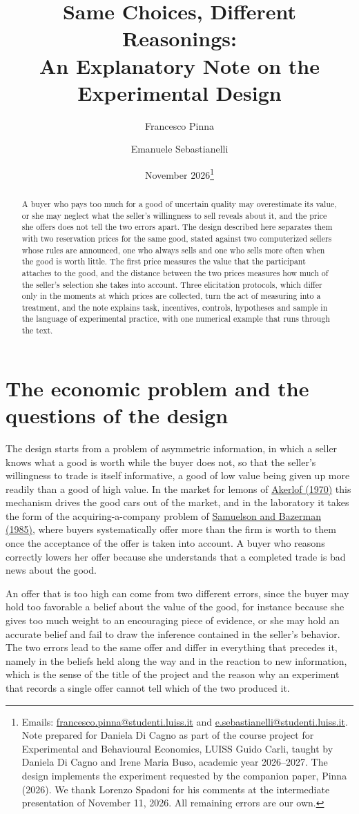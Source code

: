 \documentclass[11pt,a4paper]{article}
\title{Same Choices, Different Reasonings:\\ An Explanatory Note on the Experimental Design}
\author{Francesco Pinna \and Emanuele Sebastianelli}
\date{November 2026\thanks{Emails: \href{mailto:francesco.pinna@studenti.luiss.it}{francesco.pinna@studenti.luiss.it} and \href{mailto:e.sebastianelli@studenti.luiss.it}{e.sebastianelli@studenti.luiss.it}. Note prepared for Daniela Di Cagno as part of the course project for Experimental and Behavioural Economics, LUISS Guido Carli, taught by Daniela Di Cagno and Irene Maria Buso, academic year 2026--2027. The design implements the experiment requested by the companion paper, Pinna (2026). We thank Lorenzo Spadoni for his comments at the intermediate presentation of November 11, 2026. All remaining errors are our own.}}
\newcommand{\cy}[2]{\hyperlink{cite.#1}{\textcolor{citecolor}{#2}}}
\begin{document}
\maketitle

\begin{abstract}
\noindent A buyer who pays too much for a good of uncertain quality may overestimate its value, or she may neglect what the seller's willingness to sell reveals about it, and the price she offers does not tell the two errors apart. The design described here separates them with two reservation prices for the same good, stated against two computerized sellers whose rules are announced, one who always sells and one who sells more often when the good is worth little. The first price measures the value that the participant attaches to the good, and the distance between the two prices measures how much of the seller's selection she takes into account. Three elicitation protocols, which differ only in the moments at which prices are collected, turn the act of measuring into a treatment, and the note explains task, incentives, controls, hypotheses and sample in the language of experimental practice, with one numerical example that runs through the text.
\end{abstract}

\section{The economic problem and the questions of the design}\label{sec:problem}

The design starts from a problem of asymmetric information, in which a seller knows what a good is worth while the buyer does not, so that the seller's willingness to trade is itself informative, a good of low value being given up more readily than a good of high value. In the market for lemons of \cy{akerlof}{Akerlof (1970)} this mechanism drives the good cars out of the market, and in the laboratory it takes the form of the acquiring-a-company problem of \cy{samuelsonbazerman}{Samuelson and Bazerman (1985)}, where buyers systematically offer more than the firm is worth to them once the acceptance of the offer is taken into account. A buyer who reasons correctly lowers her offer because she understands that a completed trade is bad news about the good.

An offer that is too high can come from two different errors, since the buyer may hold too favorable a belief about the value of the good, for instance because she gives too much weight to an encouraging piece of evidence, or she may hold an accurate belief and fail to draw the inference contained in the seller's behavior. The two errors lead to the same offer and differ in everything that precedes it, namely in the beliefs held along the way and in the reaction to new information, which is the sense of the title of the project and the reason why an experiment that records a single offer cannot tell which of the two produced it.
\end{document}
